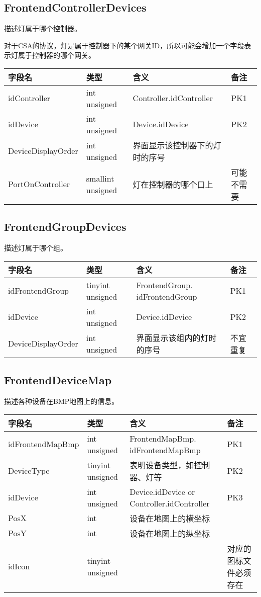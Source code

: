 \subsection{FrontendControllerDevices}\label{frontendcontrollerdevices}

描述灯属于哪个控制器。

对于CSA的协议，灯是属于控制器下的某个网关ID，所以可能会增加一个字段表示灯属于控制器的哪个网关。

\begin{longtabu}[c]{@{}lXXX@{}}
\toprule
字段名 & 类型 & 含义 & 备注\tabularnewline
\midrule
\endhead
idController & int unsigned & Controller.idController &
PK1\tabularnewline
idDevice & int unsigned & Device.idDevice & PK2\tabularnewline
DeviceDisplayOrder & int unsigned & 界面显示该控制器下的灯时的序号
&\tabularnewline
PortOnController & smallint unsigned & 灯在控制器的哪个口上 &
可能不需要\tabularnewline
\bottomrule
\end{longtabu}

\subsection{FrontendGroupDevices}\label{frontendgroupdevices}

描述灯属于哪个组。

\begin{longtabu}[c]{@{}lXXX@{}}
\toprule
字段名 & 类型 & 含义 & 备注\tabularnewline
\midrule
\endhead
idFrontendGroup & tinyint unsigned & FrontendGroup. idFrontendGroup &
PK1\tabularnewline
idDevice & int unsigned & Device.idDevice & PK2\tabularnewline
DeviceDisplayOrder & int unsigned & 界面显示该组内的灯时的序号 &
不宜重复\tabularnewline
\bottomrule
\end{longtabu}

\subsection{FrontendDeviceMap}\label{frontenddevicemap}

描述各种设备在BMP地图上的信息。

\begin{longtabu}[c]{@{}lXXX@{}}
\toprule
字段名 & 类型 & 含义 & 备注\tabularnewline
\midrule
\endhead
idFrontendMapBmp & int unsigned & FrontendMapBmp. idFrontendMapBmp &
PK1\tabularnewline
DeviceType & tinyint unsigned & 表明设备类型，如控制器、灯等 &
PK2\tabularnewline
idDevice & int unsigned & Device.idDevice or Controller.idController &
PK3\tabularnewline
PosX & int & 设备在地图上的横坐标 &\tabularnewline
PosY & int & 设备在地图上的纵坐标 &\tabularnewline
idIcon & tinyint unsigned & & 对应的图标文件必须存在\tabularnewline
\bottomrule
\end{longtabu}

